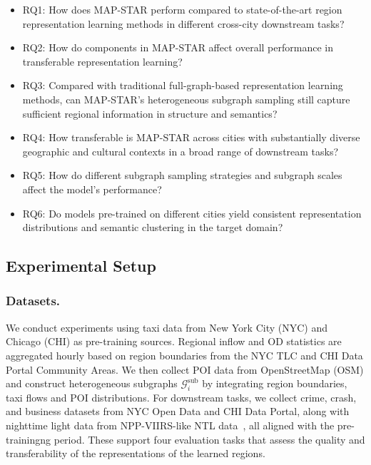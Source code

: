 \begin{itemize}
    \item RQ1: How does MAP-STAR perform compared to state-of-the-art region representation learning methods in different cross-city downstream tasks?
    \item RQ2: How do components in MAP-STAR affect overall performance in transferable representation learning?
    \item RQ3: Compared with traditional full-graph-based representation learning methods, can MAP-STAR’s heterogeneous subgraph sampling still capture sufficient regional information in structure and semantics?
    \item RQ4: How transferable is MAP-STAR across cities with substantially diverse geographic and cultural contexts in a broad range of downstream tasks?
    \item RQ5: How do different subgraph sampling strategies and subgraph scales affect the model’s performance?
    \item RQ6: Do models pre-trained on different cities yield consistent representation distributions and semantic clustering in the target domain?
\end{itemize}



\subsection{Experimental Setup}
\subsubsection{Datasets.} 

We conduct experiments using taxi data from New York City (NYC) and Chicago (CHI) as pre-training sources. Regional inflow and OD statistics are aggregated hourly based on region boundaries from the NYC TLC and CHI Data Portal Community Areas. We then collect POI data from OpenStreetMap (OSM) and construct heterogeneous subgraphs $\mathcal{G}_i^{\text{sub}}$ by integrating region boundaries, taxi flows and POI distributions. For downstream tasks, we collect crime, crash, and business datasets from NYC Open Data and CHI Data Portal, along with nighttime light data from NPP-VIIRS-like NTL data~\cite{DVN/YGIVCD_2020}, all aligned with the pre-trainingng period. These support four evaluation tasks that assess the quality and transferability of the representations of the learned regions.

